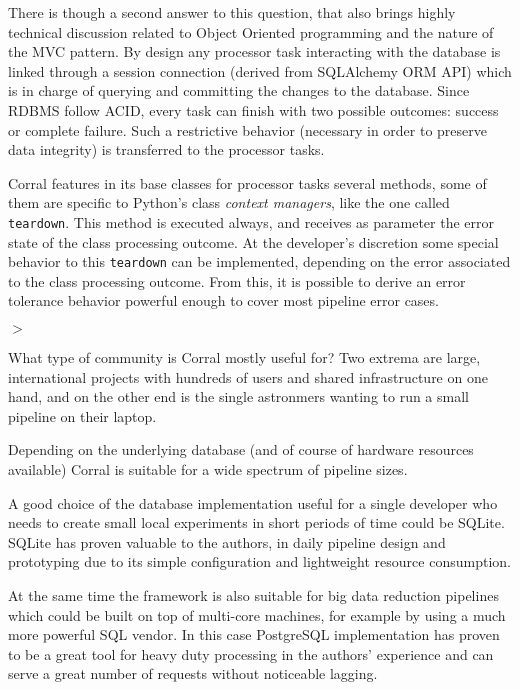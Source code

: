 \documentclass[a4paper,onecolumn,fleqn,usenatbib,useAMS]{mnrasr}
\newenvironment{myindentpar}[1]%
 {\begin{list}{}%
         \bigskip
         \color{refereecolor}
         {\setlength{\leftmargin}{#1}}%
         \itshape
         \item[$>$]%
 }
 {\end{list}}
\begin{document}
There is though a second answer to this question, that also brings highly technical
discussion related to Object Oriented programming and the nature of
the MVC pattern.
%
By design any processor task interacting with the database is linked through
a session connection (derived from SQLAlchemy ORM API) which is in charge of
querying and committing the changes to the database.
%
Since RDBMS follow ACID, every task can finish with two possible outcomes:
success or complete failure. 
%
Such a restrictive behavior (necessary in order to preserve data integrity)
is transferred to the processor tasks. 

Corral features in its base classes for processor tasks several methods,
some of them are specific to Python's class \textit{context managers},
like the one called \verb|teardown|. 
%
This method is executed always, and receives as parameter the error state of
the class processing outcome. 
%
At the developer's discretion some special behavior to this 
\verb|teardown| can be implemented, depending on the error associated to the class processing
outcome. 
%
From this, it is possible to derive an error tolerance behavior 
powerful enough to cover most pipeline error cases.

\begin{myindentpar}{1cm}
What type of community is Corral mostly useful for? Two extrema are
large, international projects with hundreds of users and shared
infrastructure on one hand, and on the other end is the single
astronmers wanting to run a small pipeline on their laptop.
 
\end{myindentpar}

%
Depending on the underlying database (and of course of hardware resources
available) Corral is suitable for a wide spectrum of pipeline sizes.

%
A good choice of the database implementation useful for a single developer who needs to create small local experiments
in short periods of time could be SQLite. SQLite has proven valuable to the authors, in
daily pipeline design and prototyping due to its simple configuration
and lightweight resource consumption.

At the same time the framework is also suitable for big data reduction pipelines 
which could be built on top of multi-core machines, for example by
using a much more powerful SQL vendor. 
%
In this case PostgreSQL implementation
has proven to be a great tool for heavy duty processing in the authors' experience
and can serve a great number of requests without noticeable lagging.
\end{document}
